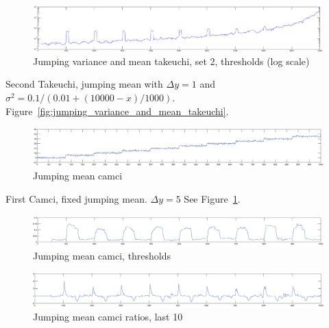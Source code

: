 \begin{figure}
\centering
  \includegraphics[width=1\textwidth]{./Figures/notes/jumping_variance_mean_takeuchi_thresholds_log_scale.eps}
  \caption[Jumping variance mean Takeuchi, set 2, thresholds]{Jumping variance and mean takeuchi, set 2, thresholds (log scale)}
\end{figure}

Second Takeuchi, jumping mean with $\Delta y = 1$ and $\sigma^2 = 0.1 / (0.01 + (10000 - x)/1000)$.
Figure~\ref{fig:jumping_variance_and_mean_takeuchi}.

\begin{figure}
\centering
  \includegraphics[width=1\textwidth]{./Figures/notes/jumping_mean_camci.eps}
  \caption[Jumping mean camci]{Jumping mean camci}
  \label{fig:camci_mean_fixed}
\end{figure}

First Camci, fixed jumping mean.
$\Delta y = 5$
See Figure~\ref{fig:camci_mean_fixed}.


\begin{figure}
\centering
  \includegraphics[width=1\textwidth]{./Figures/notes/jumping_mean_camci_thresholds.eps}
  \caption[Jumping mean camci thresholds]{Jumping mean camci, thresholds}
\end{figure}

\begin{figure}
\centering
  \includegraphics[width=1\textwidth]{./Figures/notes/jumping_mean_camci_ratios_10.eps}
  \caption[Jumping mean camci ratios]{Jumping mean camci ratios, last 10}
  \label{fig:jumping_mean_ratios}
\end{figure}

